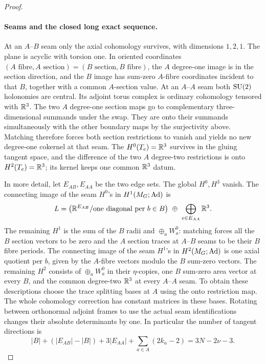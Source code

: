 \begin{proof}
\paragraph{Seams and the closed long exact sequence.}
At an \(A\)--\(B\) seam only the axial cohomology survives, with dimensions \(1,2,1\). The plane is acyclic with torsion one. In oriented coordinates \((A\text{ fibre},A\text{ section})=(B\text{ section},B\text{ fibre})\), the \(A\) degree-one image is in the section direction, and the \(B\) image has sum-zero \(A\)-fibre coordinates incident to that \(B\), together with a common \(A\)-section value. At an \(A\)--\(A\) seam both \(\mathrm{SU}(2)\) holonomies are central. Its adjoint torus complex is ordinary cohomology tensored with \(\mathbb R^3\). The two \(A\) degree-one section maps go to complementary three-dimensional summands under the swap. They are onto their summands simultaneously with the other boundary maps by the surjectivity above. Matching therefore forces both section restrictions to vanish and yields no new degree-one cokernel at that seam. The \(H^0(T_e)=\mathbb R^3\) survives in the gluing tangent space, and the difference of the two \(A\) degree-two restrictions is onto \(H^2(T_e)=\mathbb R^3\); its kernel keeps one common \(\mathbb R^3\) datum.

In more detail, let \(E_{AB},E_{AA}\) be the two edge sets. The global \(H^0,H^3\) vanish. The connecting image of the seam \(H^0\)'s in \(H^1(M_G;\operatorname{Ad})\) is
\[
 L=\bigl(\mathbb R^{E_{AB}}/\text{one diagonal per }b\in B\bigr)
       \ \oplus\ \bigoplus_{e\in E_{AA}}\mathbb R^3 .
\]
The remaining \(H^1\) is the sum of the \(B\) radii and \(\oplus_a W_a^0\): matching forces all the \(B\) section vectors to be zero and the \(A\) section traces at \(A\)--\(B\) seams to be their \(B\) fibre periods. The connecting image of the seam \(H^1\)'s in \(H^2(M_G;\operatorname{Ad})\) is one axial quotient per \(b\), given by the \(A\)-fibre vectors modulo the \(B\) sum-zero vectors. The remaining \(H^2\) consists of \(\oplus_a W_a^0\) in their \(\eta\)-copies, one \(B\) sum-zero area vector at every \(B\), and the common degree-two \(\mathbb R^3\) at every \(A\)--\(A\) seam. To obtain these descriptions choose the trace splitting bases at \(A\) using the onto restriction map. The whole cohomology correction has constant matrices in these bases. Rotating between orthonormal adjoint frames to use the actual seam identifications changes their absolute determinants by one. In particular the number of tangent directions is
\[
 |B|+(|E_{AB}|-|B|)+3|E_{AA}|+\sum_{a\in A}(2k_a-2)
  =3N-2\nu-3.
\]


\end{proof}
